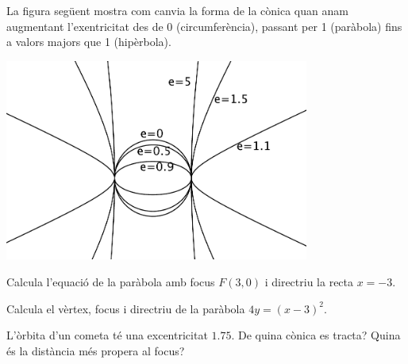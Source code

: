 \begin{theorybox}
 	
 	\begin{minipage}{0.5\textwidth}
	La figura següent mostra com canvia la forma de la cònica quan anam augmentant l'exentricitat des de 0 (circumferència), passant per 1 (paràbola) fins a valors majors que 1 (hipèrbola).
	\end{minipage}
	\begin{minipage}{0.5\textwidth} 
		\begin{center}
			\vspace{-0.25cm}
			\includegraphics[width=0.75\textwidth]{img-10/excentricitats}
		\end{center}
	\end{minipage}
	 
\end{theorybox}

\begin{mylist}
	\exer[1] Calcula l'equació de la paràbola amb focus $F(3,0)$ i directriu la recta $x=-3$.
	
	\exer[1] Calcula el vèrtex, focus i directriu de la paràbola $4y=(x-3)^2$.
	
	\exer[1] L'òrbita d'un cometa té una excentricitat $1.75$. De quina cònica es tracta? Quina és la distància més propera al focus?
	
\end{mylist}



